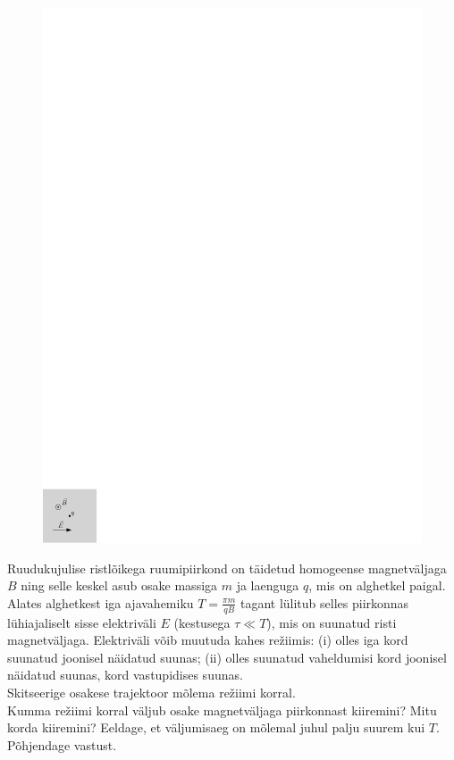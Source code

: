 \documentclass[10pt]{article}
\begin{document}
{
\begin{figure}
	\vspace{-2.5ex}
	\includegraphics[width=\linewidth]{2010-lahg-08-laengu_joonis_ipe}
	\vspace{-6ex}
\end{figure}
Ruudukujulise ristlõikega ruumipiirkond on täidetud homogeense magnetväljaga
$B$ ning selle keskel asub osake massiga $m$ ja laenguga $q$, mis on alghetkel
paigal. Alates alghetkest iga ajavahemiku $T=\frac{\pi m}{qB}$ tagant lülitub
selles piirkonnas lühiajaliselt sisse elektriväli $E$ (kestusega $\tau \ll T$), mis
on suunatud risti magnetväljaga. Elektriväli võib muutuda kahes
režiimis: (i) olles iga kord suunatud joonisel näidatud suunas; (ii)
olles suunatud vaheldumisi kord joonisel näidatud suunas, kord vastupidises
suunas.\\
\osa Skitseerige osakese trajektoor mõlema režiimi korral.\\
\osa Kumma
režiimi korral väljub osake magnetväljaga piirkonnast kiiremini? Mitu korda
kiiremini?
Eeldage, et väljumisaeg on mõlemal juhul palju suurem kui $T$. Põhjendage vastust.
\probend
\bigskip

}
\end{document}
